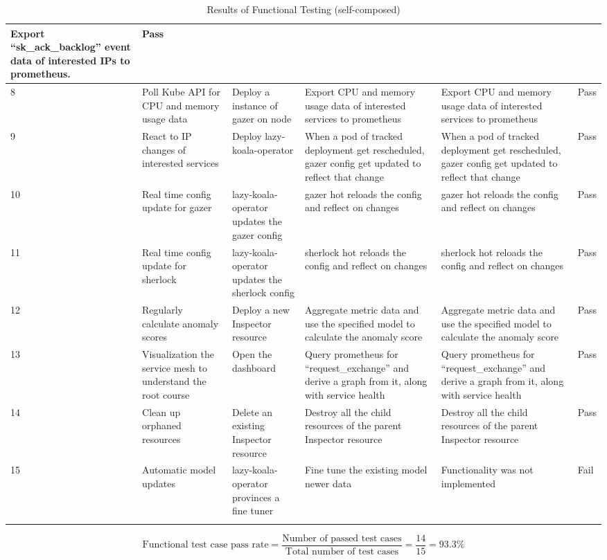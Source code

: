 \begin{longtable}{|p{3mm}|p{30mm}|p{27mm}|p{33mm}|p{33mm}|p{10mm}|}
      Export “sk\_ack\_backlog” event data of interested IPs to prometheus. &
      Pass \\ \hline
    8 &
      Poll Kube API for CPU and memory usage data &
      Deploy a instance of \ac{gazer} on node &
      Export CPU and memory usage data of interested services to prometheus &
      Export CPU and memory usage data of interested services to prometheus &
      Pass \\ \hline
    9 &
      React to IP changes of interested services &
      Deploy \ac{lazy-koala-operator} &
      When a pod of tracked deployment get rescheduled, gazer config get updated to reflect that change &
      When a pod of tracked deployment get rescheduled, gazer config get updated to reflect that change &
      Pass \\ \hline
    10 &
      Real time config update for \ac{gazer} &
      \ac{lazy-koala-operator} updates the \ac{gazer} config &
      \ac{gazer} hot reloads the config and reflect on changes &
      \ac{gazer} hot reloads the config and reflect on changes &
      Pass \\ \hline
    11 &
      Real time config update for \ac{sherlock} &
      \ac{lazy-koala-operator} updates the \ac{sherlock} config &
      \ac{sherlock} hot reloads the config and reflect on changes &
      \ac{sherlock} hot reloads the config and reflect on changes &
      Pass \\ \hline
    12 &
      Regularly calculate anomaly scores &
      Deploy a new Inspector resource &
      Aggregate metric data and use the specified model to calculate the anomaly score &
      Aggregate metric data and use the specified model to calculate the anomaly score &
      Pass \\ \hline
    13 &
      Visualization the service mesh to understand the root course &
      Open the dashboard &
      Query prometheus for “request\_exchange” and derive a graph from it, along with service health &
      Query prometheus for “request\_exchange” and derive a graph from it, along with service health &
      Pass \\ \hline
    14 &
      Clean up orphaned resources &
      Delete an existing Inspector resource &
      Destroy all the child resources of the parent Inspector resource &
      Destroy all the child resources of the parent Inspector resource &
      Pass \\ \hline
    15 &
      Automatic model updates &
      \ac{lazy-koala-operator} provinces a fine tuner &
      Fine tune the existing model newer data &
      Functionality was not implemented &
      Fail \\ \hline

      \caption{Results of Functional Testing (self-composed)}
\end{longtable}

\begingroup
\setlength{\abovedisplayskip}{-0.5cm}
\[
\text{Functional test case pass rate} = \frac{\text{Number of passed test cases}}{\text{Total number of test cases}} = \frac{14}{15} = 93.3\%
\]
\endgroup